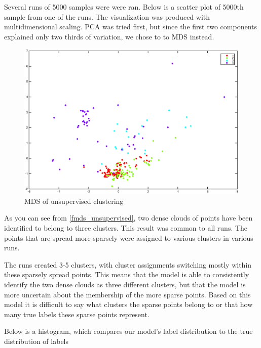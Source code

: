 \documentclass[a4paper]{article}
\begin{document}
\par
Several runs of 5000 samples were were ran. Below is a scatter plot of 5000th sample from one of the runs. The visualization was produced with multidimensional scaling. PCA was tried first, but since the first two components explained only two thirds of variation, we chose to to MDS instead. 

\begin{figure}[H]
	\includegraphics[scale=0.67]{5000_normalized_data_1.eps}
	\caption{MDS of unsupervised clustering}
	\label{mds_unsupervised}
\end{figure}

As you can see from \ref{fmds_unsupervised}, two dense clouds of points have been identified to belong to three clusters. This result was common to all runs. The points that are spread more sparsely were assigned to various clusters in various runs. 

\par
The runs created 3-5 clusters, with cluster assignments switching mostly within these sparsely spread points. This means that the model is able to consistently identify the two dense clouds as three different clusters, but that the model is more uncertain about the membership of the more sparse points. Based on this model it is difficult to say what clusters the sparse points belong to or that how many true labels these sparse points represent.

\par
Below is a histogram, which compares our model's label distribution to the true distribution of labels
\end{document}
